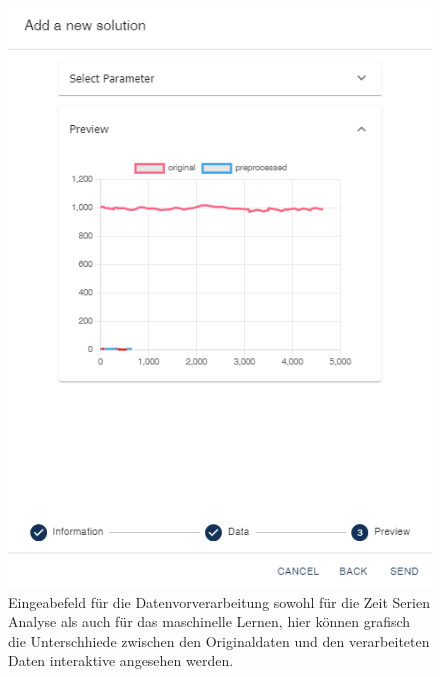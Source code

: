 \begin{figure}[ht]
    \centering
    \begin{minipage}{0.5\textwidth}
        \centering
        \includegraphics[width=\linewidth]{includes/figures/new_version/data_processing_2.png}
        \caption{Eingeabefeld für die Datenvorverarbeitung sowohl für die Zeit Serien Analyse als auch für das maschinelle Lernen, hier können grafisch die Unterschhiede zwischen den Originaldaten und den verarbeiteten Daten interaktive angesehen werden.}
        \label{fig:configuration_graph_overview}
    \end{minipage}\hfill
    \begin{minipage}{0.5\textwidth}
        \centering

\end{minipage}
\end{figure}
